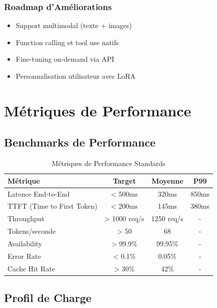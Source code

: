 \documentclass[12pt,a4paper]{article}
\begin{document}
\subsubsection{Roadmap d'Améliorations}
\begin{itemize}[noitemsep]
    \item Support multimodal (texte + images)
    \item Function calling et tool use natifs
    \item Fine-tuning on-demand via API
    \item Personnalisation utilisateur avec LoRA
\end{itemize}

\newpage
\section{Métriques de Performance}

\subsection{Benchmarks de Performance}

\begin{table}[h]
\centering
\begin{tabular}{|l|c|c|c|}
\hline
\textbf{Métrique} & \textbf{Target} & \textbf{Moyenne} & \textbf{P99} \\
\hline
Latence End-to-End & < 500ms & 320ms & 850ms \\
TTFT (Time to First Token) & < 200ms & 145ms & 380ms \\
Throughput & > 1000 req/s & 1250 req/s & - \\
Tokens/seconde & > 50 & 68 & - \\
Availability & > 99.9\% & 99.95\% & - \\
Error Rate & < 0.1\% & 0.05\% & - \\
Cache Hit Rate & > 30\% & 42\% & - \\
\hline
\end{tabular}
\caption{Métriques de Performance Standards}
\end{table}

\subsection{Profil de Charge}
\end{document}
